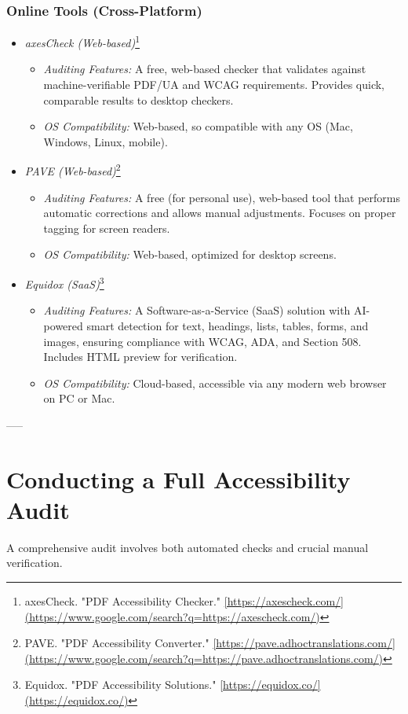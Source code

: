 \subsubsection{Online Tools (Cross-Platform)}
\label{subsubsec:online-tools}
\begin{itemize}
\item \emph{axesCheck (Web-based)}\footnote{axesCheck. "PDF Accessibility Checker." \url{[https://axescheck.com/](https://www.google.com/search?q=https://axescheck.com/)}}
\begin{itemize}
\item \emph{Auditing Features:} A free, web-based checker that validates against machine-verifiable PDF/UA and WCAG requirements. Provides quick, comparable results to desktop checkers.
\item \emph{OS Compatibility:} Web-based, so compatible with any OS (Mac, Windows, Linux, mobile).
\end{itemize}
\item \emph{PAVE (Web-based)}\footnote{PAVE. "PDF Accessibility Converter." \url{[https://pave.adhoctranslations.com/](https://www.google.com/search?q=https://pave.adhoctranslations.com/)}}
\begin{itemize}
\item \emph{Auditing Features:} A free (for personal use), web-based tool that performs automatic corrections and allows manual adjustments. Focuses on proper tagging for screen readers.
\item \emph{OS Compatibility:} Web-based, optimized for desktop screens.
\end{itemize}
\item \emph{Equidox (SaaS)}\footnote{Equidox. "PDF Accessibility Solutions." \url{[https://equidox.co/](https://equidox.co/)}}
\begin{itemize}
\item \emph{Auditing Features:} A Software-as-a-Service (SaaS) solution with AI-powered smart detection for text, headings, lists, tables, forms, and images, ensuring compliance with WCAG, ADA, and Section 508. Includes HTML preview for verification.
\item \emph{OS Compatibility:} Cloud-based, accessible via any modern web browser on PC or Mac.
\end{itemize}
\end{itemize}

-----

\section{Conducting a Full Accessibility Audit}
\label{sec:conducting-audit}
A comprehensive audit involves both automated checks and crucial manual verification.

